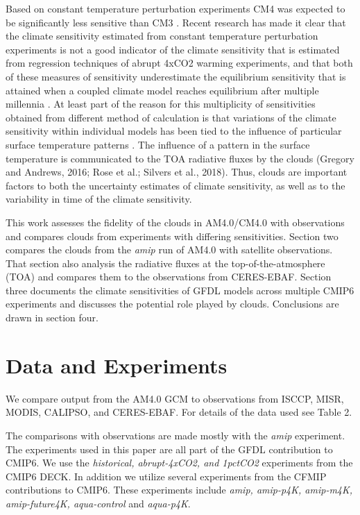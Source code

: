 \documentclass[draft]{agujournal2019}
\begin{document}
Based on constant temperature perturbation experiments CM4 was expected to be significantly less sensitive 
than CM3 \cite{Zhao_2014}.
Recent research has made it clear that the climate sensitivity estimated from constant temperature perturbation 
experiments is not a good indicator of the climate sensitivity that is estimated from regression techniques of 
abrupt 4xCO2 warming experiments, and that both 
of these measures of sensitivity underestimate the equilibrium sensitivity that is attained when a coupled climate 
model reaches equilibrium after multiple millennia \cite{Paynter_etal_2018,Rugenstein_etal_2020}.     
At least part of the reason for this multiplicity of 
sensitivities obtained from different method of calculation is that variations of the climate sensitivity within 
individual models has been tied to the influence of particular surface temperature patterns 
\cite{Gregory_Andrews_2016, Zhou_etal_2016, Andrews_Webb_2018, Silvers_etal_2018}.   
The influence of a pattern in the surface temperature is communicated to the TOA radiative fluxes by the clouds 
(Gregory and Andrews, 2016; Rose et al.; Silvers et al., 2018).   Thus, clouds are important factors to both the uncertainty 
estimates of climate sensitivity, as well as to the variability in time of the climate sensitivity.  

This work assesses the fidelity of the clouds in AM4.0/CM4.0 with observations and compares clouds from experiments 
with differing sensitivities. 
Section two compares the clouds from the \textit{amip} run of AM4.0 with satellite observations.  That section also 
analysis the radiative fluxes at the top-of-the-atmosphere (TOA) and compares them to the observations from 
CERES-EBAF.    Section three documents the climate sensitivities of GFDL models across multiple CMIP6 experiments 
and discusses the potential role played by clouds.   Conclusions are drawn in section four.  

\section{Data and Experiments}

We compare output from the AM4.0 GCM to observations from ISCCP, MISR, MODIS, CALIPSO, and CERES-EBAF.
For details of the data used see Table 2.

The comparisons with observations are made mostly with the \textit{amip} experiment.   The experiments used 
in this paper are all part of the GFDL contribution to CMIP6.  We use the \textit{historical, abrupt-4xCO2, and 1pctCO2}
experiments from the CMIP6 DECK.  In addition we utilize several experiments from the CFMIP contributions 
to CMIP6.  These experiments include \textit{amip, amip-p4K, amip-m4K, amip-future4K, aqua-control} and \textit{aqua-p4K}. 
\end{document}
